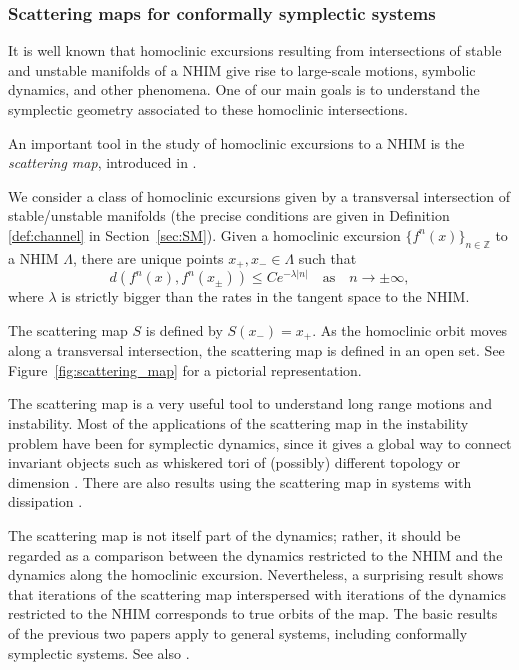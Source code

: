 \documentclass[11pt]{amsart}
\theoremstyle{definition}
\theoremstyle{remark}
\numberwithin{equation}{section}
\begin{document}
\medskip

\subsubsection{Scattering maps for conformally symplectic systems}

It is well known that homoclinic excursions resulting from intersections of stable and unstable manifolds of a NHIM give rise to large-scale motions, symbolic dynamics, and other phenomena.
One of our main goals is to understand the symplectic geometry associated to these homoclinic intersections.

   An important tool in the study of homoclinic excursions to a NHIM  is the \emph{scattering map},
   introduced in \cite{DLS00}.


   We consider a class of homoclinic excursions given by a transversal
   intersection of stable/unstable manifolds (the precise conditions
   are given in Definition \ref{def:channel} in Section~\ref{sec:SM}).
   Given a homoclinic excursion $\{f^n(x)\}_{n \in \mathbb{Z}}$
   to a NHIM $\Lambda$, there are unique points $x_+, x_- \in \Lambda$ such
   that
   \[
   d( f^n(x), f^n( x_\pm) ) \le C e^{-\lambda |n|} \quad \textrm{as} \quad n \to \pm \infty,
   \]
   where $\lambda$ is strictly bigger than the rates in
   the tangent space to the NHIM.


  The scattering map $S$ is defined by $S(x_-) = x_+$.
  As  the homoclinic orbit moves along a transversal intersection,
  the scattering map is  defined in an open set.
  See Figure~\ref{fig:scattering_map} for a pictorial
  representation.



     The scattering map is
     a very useful tool to understand long range motions and instability.
     Most of the applications of the scattering map in the instability problem
     have been for symplectic dynamics,  since it gives
     a global way to connect invariant objects such
     as whiskered tori of (possibly) different topology or dimension
     \cite{DelshamsLS06a,zbMATH06567884}.
     There are also results using the scattering map in
     systems with dissipation \cite{Granados17,GideaLM22,AkingbadeGS23}.


     The scattering map is not itself part of the dynamics; rather, it should be regarded as a comparison between the dynamics restricted to
     the NHIM and the dynamics along the homoclinic excursion.  Nevertheless,
     a surprising result
     \cite{GideaLS20a, GideaLS20} shows that iterations of the  scattering map
     interspersed with  iterations of the  dynamics restricted to the NHIM corresponds to
     true orbits of the map. The basic results of the previous two papers apply to general systems, including conformally symplectic systems.
     See also \cite{DelshamsGR12}.
\end{document}
